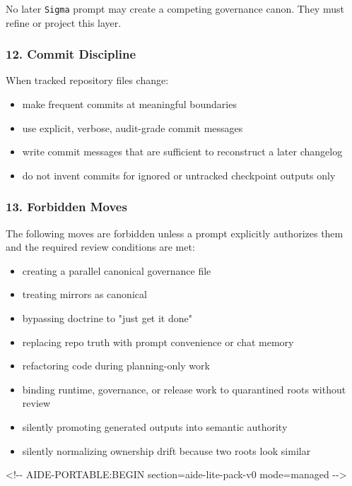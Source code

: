 \documentclass[9pt,a4paper,openany]{book}
\begin{document}
No later \texttt{Sigma} prompt may create a competing governance canon.\allowbreak{} They must refine or project this layer.\allowbreak{}


\subsubsection{12. Commit Discipline}

When tracked repository files change:


\begin{itemize}
\item make frequent commits at meaningful boundaries
\item use explicit, verbose, audit-\allowbreak{}grade commit messages
\item write commit messages that are sufficient to reconstruct a later changelog
\item do not invent commits for ignored or untracked checkpoint outputs only
\end{itemize}

\subsubsection{13. Forbidden Moves}

The following moves are forbidden unless a prompt explicitly authorizes them and the required review conditions are met:


\begin{itemize}
\item creating a parallel canonical governance file
\item treating mirrors as canonical
\item bypassing doctrine to "just get it done"
\item replacing repo truth with prompt convenience or chat memory
\item refactoring code during planning-\allowbreak{}only work
\item binding runtime, governance, or release work to quarantined roots without review
\item silently promoting generated outputs into semantic authority
\item silently normalizing ownership drift because two roots look similar
\end{itemize}

<!-\allowbreak{}-\allowbreak{} AIDE-\allowbreak{}PORTABLE:BEGIN section=aide-\allowbreak{}lite-\allowbreak{}pack-\allowbreak{}v0 mode=managed -\allowbreak{}-\allowbreak{}>
\end{document}
